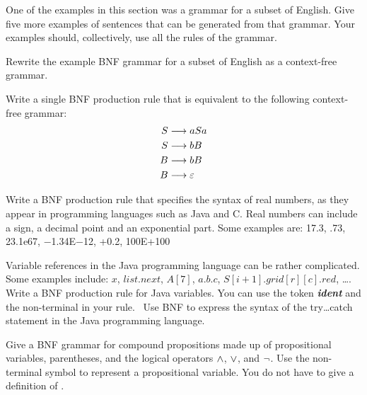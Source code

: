 \begin{exercises}

\problem One of the examples in this section was a grammar for
a subset of English.  Give five more examples of sentences that
can be generated from that grammar.  Your examples should, collectively,
use all the rules of the grammar.

\problem Rewrite the example BNF grammar for a subset of English as
a context-free grammar.

\problem Write a single BNF production rule that is equivalent to
the following context-free grammar:
\begin{align*}
    S &\longrightarrow aSa\\
    S &\longrightarrow bB\\
    B &\longrightarrow bB\\
    B &\longrightarrow \varepsilon
\end{align*}

\problem Write a BNF production rule that specifies the syntax of
real numbers, as they appear in programming languages such as Java and C.  
Real numbers can include a sign, a decimal point and an exponential part.
Some examples are:  17.3, .73, 23.1e67, $-$1.34E$-$12, +0.2, 100E+100

\problem Variable references in the Java programming language can be 
rather complicated.  Some examples include:
$x$, $list.next$, $A[7]$, $a.b.c$, $S[i+1].grid[r][c].red$, \dots.
Write a BNF production rule for Java variables.
You can use the token \textbf{\textsl{ident}} and the non-terminal
 in your rule.
\
\problem Use BNF to express the syntax of the try\dots catch statement in the
Java programming language.

\problem Give a BNF grammar for compound propositions made up
of propositional variables, parentheses, and the logical operators
$\wedge$, $\vee$, and $\lnot$.  Use the non-terminal symbol  to represent
a propositional variable.  You do not have to give a definition of
\NT{pv}.

\end{exercises}



